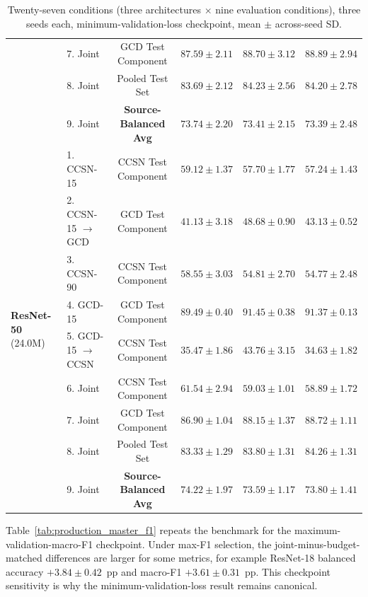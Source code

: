 \documentclass[11pt,a4paper]{article}
\begin{document}
\begin{table}[!htbp]
{\begin{tabular}{llcccc}
& 7. Joint & GCD Test Component & $87.59 \pm 2.11$ & $88.70 \pm 3.12$ & $88.89 \pm 2.94$ \\
& 8. Joint & Pooled Test Set & $83.69 \pm 2.12$ & $84.23 \pm 2.56$ & $84.20 \pm 2.78$ \\
& 9. Joint & \textbf{Source-Balanced Avg} & $73.74 \pm 2.20$ & $73.41 \pm 2.15$ & $73.39 \pm 2.48$ \\
\midrule
\multirow{9}{*}{\textbf{ResNet-50} (24.0M)} 
& 1. CCSN-15 & CCSN Test Component & $59.12 \pm 1.37$ & $57.70 \pm 1.77$ & $57.24 \pm 1.43$ \\
& 2. CCSN-15 $\to$ GCD & GCD Test Component & $41.13 \pm 3.18$ & $48.68 \pm 0.90$ & $43.13 \pm 0.52$ \\
& 3. CCSN-90 & CCSN Test Component & $58.55 \pm 3.03$ & $54.81 \pm 2.70$ & $54.77 \pm 2.48$ \\
& 4. GCD-15 & GCD Test Component & $89.49 \pm 0.40$ & $91.45 \pm 0.38$ & $91.37 \pm 0.13$ \\
& 5. GCD-15 $\to$ CCSN & CCSN Test Component & $35.47 \pm 1.86$ & $43.76 \pm 3.15$ & $34.63 \pm 1.82$ \\
& 6. Joint & CCSN Test Component & $61.54 \pm 2.94$ & $59.03 \pm 1.01$ & $58.89 \pm 1.72$ \\
& 7. Joint & GCD Test Component & $86.90 \pm 1.04$ & $88.15 \pm 1.37$ & $88.72 \pm 1.11$ \\
& 8. Joint & Pooled Test Set & $83.33 \pm 1.29$ & $83.80 \pm 1.31$ & $84.26 \pm 1.31$ \\
& 9. Joint & \textbf{Source-Balanced Avg} & $\mathbf{74.22 \pm 1.97}$ & $73.59 \pm 1.17$ & $73.80 \pm 1.41$ \\
\bottomrule
\end{tabular}%
}
\caption{Twenty-seven conditions (three architectures $\times$ nine evaluation conditions), three seeds each, minimum-validation-loss checkpoint, mean $\pm$ across-seed SD.}
\label{tab:production_master}
\end{table}

Table~\ref{tab:production_master_f1} repeats the benchmark for the maximum-validation-macro-F1 checkpoint. Under max-F1 selection, the joint-minus-budget-matched differences are larger for some metrics, for example ResNet-18 balanced accuracy $+3.84 \pm 0.42$~pp and macro-F1 $+3.61 \pm 0.31$~pp. This checkpoint sensitivity is why the minimum-validation-loss result remains canonical.
\end{document}
